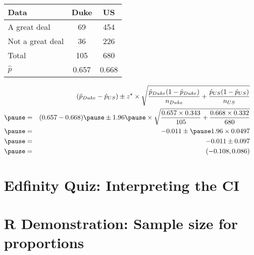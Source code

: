 \documentclass[slidestop,compress,mathserif]{beamer}
\newcommand{\soln}[1]{\textit{#1}}
\begin{document}
\begin{frame}
\frametitle{}


{\footnotesize
\begin{center}
\begin{tabular}{l | c c}
Data			& Duke		& US \\
\hline
A great deal	& 69			& 454 \\
Not a great deal& 36			& 226 \\
\hline
Total			& 105		& 680 \\
\hline
\pause
$\hat{p}$		& 0.657		& 0.668
\end{tabular}
\end{center}
}

\pause

\soln{
\begin{eqnarray*}
&& (\hat{p}_{Duke} - \hat{p}_{US}) \pm z^\star \times \sqrt{ \frac{ \hat{p}_{Duke} (1 - \hat{p}_{Duke})}{n_{Duke} } + \frac{ \hat{p}_{US} (1 -  \hat{p}_{US})}{n_{US} } }  \\
\pause
&=& (0.657 - 0.668) \pause \pm 1.96 \pause \times \sqrt{ \frac{0.657 \times 0.343}{105} + \frac{0.668 \times 0.332}{680} } \\
\pause
&=& -0.011 \pm \pause 1.96 \times 0.0497 \\
\pause
&=& -0.011 \pm 0.097 \\
\pause
&=& (-0.108, 0.086)
\end{eqnarray*}
}


\end{frame}

\section{Edfinity Quiz: Interpreting the CI}

\section{R Demonstration: Sample size for proportions}
\end{document}
